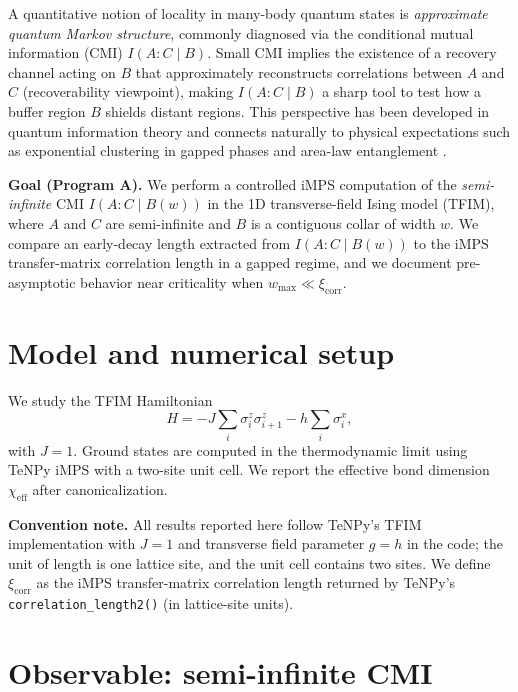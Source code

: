 \documentclass[11pt]{article}
\begin{document}
A quantitative notion of locality in many-body quantum states is
\emph{approximate quantum Markov structure}, commonly diagnosed via the
conditional mutual information (CMI) $I(A : C \mid B)$. Small CMI
implies the existence of a recovery channel acting on $B$ that
approximately reconstructs correlations between $A$ and $C$
(recoverability viewpoint), making $I(A : C \mid B)$ a sharp tool to
test how a buffer region $B$ shields distant regions. This perspective
has been developed in quantum information theory and connects naturally
to physical expectations such as exponential clustering in gapped phases
and area-law entanglement \cite{FR, BHOS, SFR, SBT, BH}.

\textbf{Goal (Program A).} We perform a controlled iMPS computation of
the \emph{semi-infinite} CMI $I(A : C \mid B(w))$ in the 1D
transverse-field Ising model (TFIM), where $A$ and $C$ are semi-infinite
and $B$ is a contiguous collar of width $w$. We compare an early-decay
length extracted from $I(A : C \mid B(w))$ to the iMPS transfer-matrix
correlation length in a gapped regime, and we document pre-asymptotic
behavior near criticality when $w_{\max} \ll \xi_{\mathrm{corr}}$.

\section{Model and numerical setup}

We study the TFIM Hamiltonian
\begin{equation}
H = -J \sum_i \sigma^z_i \sigma^z_{i+1} - h \sum_i \sigma^x_i,
\label{eq:ham}
\end{equation}
with $J = 1$. Ground states are computed in the thermodynamic limit
using TeNPy iMPS with a two-site unit cell. We report the effective bond
dimension $\chi_{\mathrm{eff}}$ after canonicalization.

\textbf{Convention note.} All results reported here follow TeNPy's TFIM
implementation with $J = 1$ and transverse field parameter $g = h$ in
the code; the unit of length is one lattice site, and the unit cell
contains two sites. We define $\xi_{\mathrm{corr}}$ as the iMPS
transfer-matrix correlation length returned by TeNPy's
\texttt{correlation\_length2()} (in lattice-site units).

\section{Observable: semi-infinite CMI}
\end{document}

